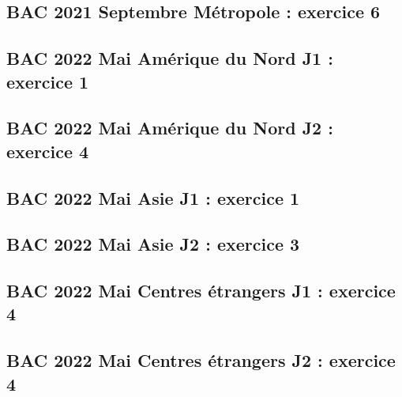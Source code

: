 \documentclass[lang=fr,edition=teacher,layout=sheet]{mxbook}
\begin{document}
\begingroup\endgroup
\par\bigskip
{}\subsection*{BAC 2021 Septembre Métropole : exercice 6}
\begingroup\endgroup
\par\bigskip
{}\subsection*{BAC 2022 Mai Amérique du Nord J1 : exercice 1}
\begingroup\endgroup
\par\bigskip
{}\subsection*{BAC 2022 Mai Amérique du Nord J2 : exercice 4}
\begingroup\endgroup
\par\bigskip
{}\subsection*{BAC 2022 Mai Asie J1 : exercice 1}
\begingroup\endgroup
\par\bigskip
{}\subsection*{BAC 2022 Mai Asie J2 : exercice 3}
\begingroup\endgroup
\par\bigskip
{}\subsection*{BAC 2022 Mai Centres étrangers J1 : exercice 4}
\begingroup\endgroup
\par\bigskip
{}\subsection*{BAC 2022 Mai Centres étrangers J2 : exercice 4}
\end{document}
